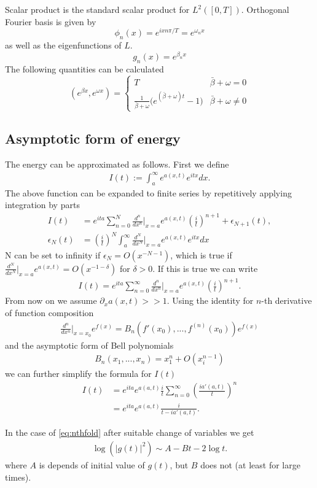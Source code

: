 \documentclass[
a4paper,%
10pt,%
titlepage,%
twoside%
]{article}
\begin{document}
Scalar product is the standard scalar product for
$L^2([0,T])$. Orthogonal Fourier basis is given by
\begin{equation}
  \label{eq:fourier_base}
  \phi_n(x)=e^{i x n \pi/T}=e^{\omega_n x}
\end{equation}
as well as the eigenfunctions of $L$.
\begin{equation}
  g_n(x)=e^{ \beta_n x}
\end{equation}
The following quantities can be calculated
\begin{equation}
  (e^{\beta x},e^{\omega x})=
  \begin{cases}
    T & \bar\beta+\omega=0 \\
    \frac{1}{\bar{\beta}+\omega}\big(e^{(\bar\beta+\omega)t}-1\big)         & \bar\beta+\omega\ne0
  \end{cases}
\end{equation}

\subsection{Asymptotic form of energy}


The energy can be approximated as follows. First we define
\begin{align}
  I(t):=\int_a^\infty e^{a(x,t)}e^{itx}dx.
\end{align}
The above function can be expanded to finite series by repetitively
applying integration by parts
\begin{align}
  I(t)&=e^{ita}\sum_{n=0}^N\frac{d^n}{dx^n}\bigg|_{x=a}e^{a(x,t)} \left(\frac{i}{t}\right)^{n+1}+\epsilon_{N+1}(t),\\
  \epsilon_{N}(t)&=\left(\frac{i}{t}\right)^{N}\int_a^\infty \frac{d^{N}}{dx^{N}}\bigg|_{x=a}e^{a(x,t)}e^{itx}dx
\end{align}
N can be set to infinity if $\epsilon_N=O(x^{-N-1})$, which is true if
$\frac{d^{N}}{dx^{N}}\bigg|_{x=a}e^{a(x,t)}=O(x^{-1-\delta})$ for
$\delta>0$. If this is true we can write
\begin{align}
  I(t)=e^{ita}\sum_{n=0}^\infty\frac{d^n}{dx^n}\bigg|_{x=a}e^{a(x,t)} \left(\frac{i}{t}\right)^{n+1}.
\end{align}
From now on we assume $\partial_x a(x,t)>>1$. Using the identity for
$n$-th derivative of function composition
\begin{align}
  \frac{d^n}{dx^n}\bigg|_{x=x_0}e^{f(x)}=B_n(f'(x_0),...,f^{(n)}(x_0))e^{f(x)}
\end{align}
and the asymptotic form of Bell polynomials
\begin{align}
  B_n(x_1,...,x_n) = x_1^n + O(x_i^{n-1})
\end{align}
we can further simplify the formula for $I(t)$
\begin{align}
  I(t)&=e^{ita}e^{a(a,t)}\frac{i}{t}\sum_{n=0}^\infty \left(\frac{ia'(a,t)}{t}\right)^{n}\\
  &=e^{ita}e^{a(a,t)}\frac{i}{t-ia'(a,t)}.
\end{align}

In the case of \eqref{eq:nthfold} after suitable change of variables we get
\begin{align}
  \log(|g(t)|^2)\sim A-Bt-2\log t.
\end{align}
where $A$ is depends of initial value of $g(t)$, but $B$ does not (at
least for large times).
\end{document}
